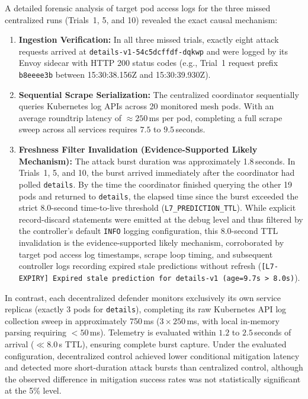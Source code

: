 A detailed forensic analysis of target pod access logs for the three missed centralized runs (Trials~1, 5, and 10) revealed the exact causal mechanism:
\begin{enumerate}
    \item \textbf{Ingestion Verification:} In all three missed trials, exactly eight attack requests arrived at \texttt{details-v1-54c5dcffdf-dqkwp} and were logged by its Envoy sidecar with HTTP 200 status codes (e.g., Trial~1 request prefix \texttt{b8eeee3b} between 15:30:38.156Z and 15:30:39.930Z).
    \item \textbf{Sequential Scrape Serialization:} The centralized coordinator sequentially queries Kubernetes log APIs across 20 monitored mesh pods. With an average roundtrip latency of $\approx 250$\,ms per pod, completing a full scrape sweep across all services requires $7.5$ to $9.5$\,seconds.
    \item \textbf{Freshness Filter Invalidation (Evidence-Supported Likely Mechanism):} The attack burst duration was approximately 1.8\,seconds. In Trials~1, 5, and 10, the burst arrived immediately after the coordinator had polled \texttt{details}. By the time the coordinator finished querying the other 19 pods and returned to \texttt{details}, the elapsed time since the burst exceeded the strict 8.0-second time-to-live threshold (\texttt{L7\_PREDICTION\_TTL}). While explicit record-discard statements were emitted at the debug level and thus filtered by the controller's default \texttt{INFO} logging configuration, this 8.0-second TTL invalidation is the evidence-supported likely mechanism, corroborated by target pod access log timestamps, scrape loop timing, and subsequent controller logs recording expired stale predictions without refresh (\texttt{[L7-EXPIRY] Expired stale prediction for details-v1 (age=9.7s > 8.0s)}).
\end{enumerate}

In contrast, each decentralized defender monitors exclusively its own service replicas (exactly 3 pods for \texttt{details}), completing its raw Kubernetes API log collection sweep in approximately 750\,ms ($3 \times 250$\,ms, with local in-memory parsing requiring $<50$\,ms). Telemetry is evaluated within $1.2$ to $2.5$\,seconds of arrival ($\ll 8.0$\,s TTL), ensuring complete burst capture. Under the evaluated configuration, decentralized control achieved lower conditional mitigation latency and detected more short-duration attack bursts than centralized control, although the observed difference in mitigation success rates was not statistically significant at the 5\% level.
